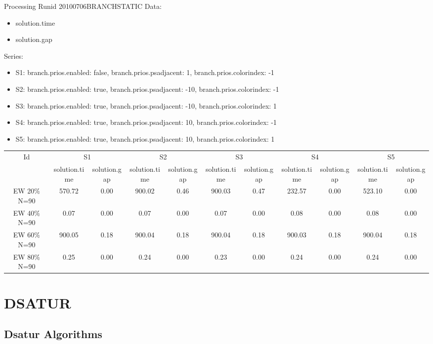 \documentclass[landscape, 12pt]{report}
\begin{document}
	Processing Runid 20100706BRANCHSTATIC
Data:
\begin{itemize}
\item solution.time
\item solution.gap
\end{itemize}
Series:
\begin{itemize}
\item S1: branch.prios.enabled: false, branch.prios.psadjacent: 1, branch.prios.colorindex: -1
\item S2: branch.prios.enabled: true, branch.prios.psadjacent: -10, branch.prios.colorindex: -1
\item S3: branch.prios.enabled: true, branch.prios.psadjacent: -10, branch.prios.colorindex: 1
\item S4: branch.prios.enabled: true, branch.prios.psadjacent: 10, branch.prios.colorindex: -1
\item S5: branch.prios.enabled: true, branch.prios.psadjacent: 10, branch.prios.colorindex: 1
\end{itemize}
\begin{tabular}{|c|cc|cc|cc|cc|cc|}
\hline
\multicolumn{1}{|c|}{Id} & \multicolumn{2}{|c|}{S1} & \multicolumn{2}{|c|}{S2} & \multicolumn{2}{|c|}{S3} & \multicolumn{2}{|c|}{S4} & \multicolumn{2}{|c|}{S5}
\\
 & solution.time & solution.gap & solution.time & solution.gap & solution.time & solution.gap & solution.time & solution.gap & solution.time & solution.gap
\\
\hline
EW 20\% N=90 & 570.72 & 0.00 & 900.02 & 0.46 & 900.03 & 0.47 & 232.57 & 0.00 & 523.10 & 0.00
\\
EW 40\% N=90 & 0.07 & 0.00 & 0.07 & 0.00 & 0.07 & 0.00 & 0.08 & 0.00 & 0.08 & 0.00
\\
EW 60\% N=90 & 900.05 & 0.18 & 900.04 & 0.18 & 900.04 & 0.18 & 900.03 & 0.18 & 900.04 & 0.18
\\
EW 80\% N=90 & 0.25 & 0.00 & 0.24 & 0.00 & 0.23 & 0.00 & 0.24 & 0.00 & 0.24 & 0.00
\\
\hline 
 \end{tabular}
		
		\clearpage
		
	\section{DSATUR}
	
	\subsection{Dsatur Algorithms}
	
\end{document}
